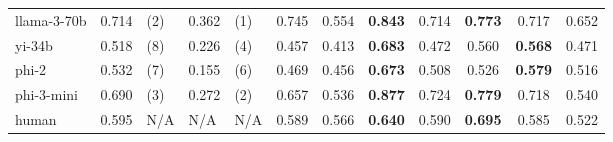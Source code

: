\begin{tabular}{
        @{}lllllccccccc@{}
        }
        llama-3-70b  & 0.714                       & (2)                             & 0.362                        & (1)                               & 0.745      & 0.554             & \textbf{0.843}    & 0.714            & \textbf{0.773}   & 0.717          & 0.652          \\
        yi-34b       & 0.518                       & (8)                             & 0.226                        & (4)                               & 0.457      & 0.413             & \textbf{0.683}    & 0.472            & 0.560            & \textbf{0.568} & 0.471          \\
        phi-2        & 0.532                       & (7)                             & 0.155                        & (6)                               & 0.469      & 0.456             & \textbf{0.673}    & 0.508            & 0.526            & \textbf{0.579} & 0.516          \\
        phi-3-mini   & 0.690                       & (3)                             & 0.272                        & (2)                               & 0.657      & 0.536             & \textbf{0.877}    & 0.724            & \textbf{0.779}   & 0.718          & 0.540          \\
        \cmidrule{1-12}
        human        & 0.595                       & N/A                             & N/A                          & N/A                               & 0.589      & 0.566             & \textbf{0.640}    & 0.590            & \textbf{0.695}   & 0.585          & 0.522          \\
        \bottomrule
    \end{tabular}
\fi
